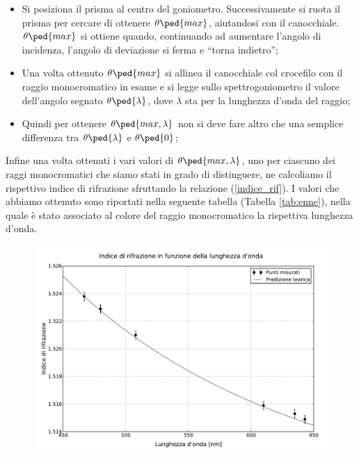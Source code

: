 \begin{itemize}
	\item{Si posiziona il prisma al centro del goniometro. Successivamente si ruota il prisma per cercare di ottenere $\theta\ped{max}$, aiutandosi con il canocchiale. $\theta\ped{max}$ si ottiene quando, continuando ad aumentare l'angolo di incidenza, l'angolo di deviazione si ferma e ``torna indietro'';}
	\item{Una volta ottenuto $\theta\ped{max}$ si allinea il canocchiale col crocefilo con il raggio monocromatico in esame e si legge sullo spettrogoniometro il valore dell'angolo segnato $\theta\ped{\lambda}$, dove $\lambda$ sta per la lunghezza d'onda del raggio;}
	\item{Quindi per ottenere $\theta\ped{max,\lambda}$ non si deve fare altro che una semplice differenza tra $\theta\ped{\lambda}$ e $\theta\ped{0}$;}
\end{itemize}

Infine una volta ottenuti i vari valori di $\theta\ped{max,\lambda}$, uno per ciascuno dei raggi monocromatici che siamo stati in grado di distinguere, ne calcoliamo il rispettivo indice di rifrazione sfruttando la relazione (\ref{indice_rif}). I valori che abbiamo ottenuto sono riportati nella seguente tabella (Tabella \ref{tab:enne}), nella quale è stato associato al colore del raggio monocromatico la rispettiva lunghezza d'onda.



\begin{figure}[t]
    \includegraphics[width=16cm]{wave_index.pdf}
    \caption{}
    \label{fig:prisma}
\end{figure}

